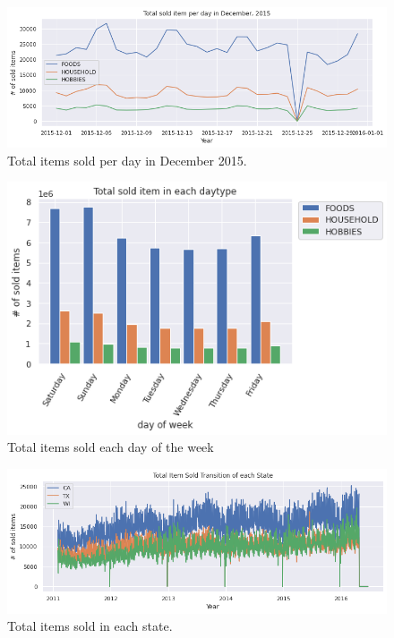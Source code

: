 \documentclass[10pt,twocolumn,letterpaper]{article}
\begin{document}
\begin{figure}
  \begin{center}
    \includegraphics[width=0.8\linewidth]{img/totalSoldItemPerDayDec2015.png}
  \end{center}
    \caption{Total items sold per day in December 2015.}
  \label{fig:short}
\end{figure}

\begin{figure}
  \begin{center}
    \includegraphics[width=0.8\linewidth]{img/totalSoldItemInEachDayOfWeek.png}
  \end{center}
    \caption{Total items sold each day of the week}
  \label{fig:short}
\end{figure}

\begin{figure}
  \begin{center}
    \includegraphics[width=0.8\linewidth]{img/totalItemSoldInEachState.png}
  \end{center}
    \caption{Total items sold in each state.}
  \label{fig:short}
\end{figure}
\end{document}
